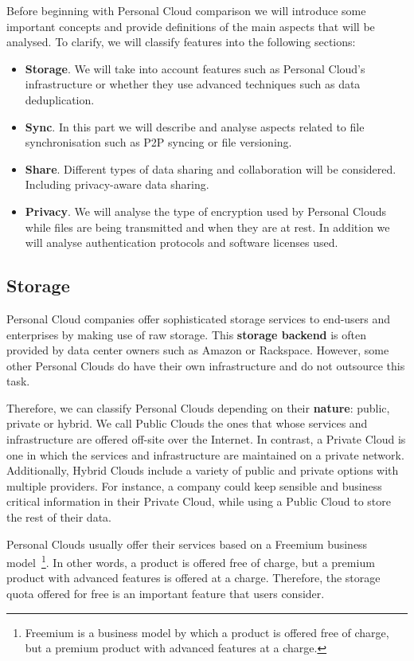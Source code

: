 Before beginning with Personal Cloud comparison we will introduce some important concepts
and provide definitions of the main aspects that will be analysed. To clarify, we will
classify features into the following sections:

\begin{itemize}
\item \textbf{Storage}. We will take into account features such as Personal Cloud's infrastructure or whether they use advanced techniques such as data deduplication.
\item \textbf{Sync}. In this part we will describe and analyse aspects related to file synchronisation such as P2P syncing or file versioning. 
\item \textbf{Share}. Different types of data sharing and collaboration will be considered. Including privacy-aware data sharing.
\item \textbf{Privacy}. We will analyse the type of encryption used by Personal Clouds while files are being transmitted and when they are at rest. In addition we will analyse authentication protocols and software licenses used.
\end{itemize}


\subsection{Storage}

Personal Cloud companies offer sophisticated storage services to end-users and enterprises by making use of raw storage. This \textbf{storage backend} is often provided by data center owners such as Amazon or Rackspace. However, some other Personal Clouds do have their own infrastructure and do not outsource this task.

Therefore, we can classify Personal Clouds depending on their \textbf{nature}: public, private or hybrid. We call Public Clouds the ones that whose services and infrastructure are offered off-site over the Internet. In contrast, a Private Cloud is one in which the services and infrastructure are maintained on a private network. Additionally, Hybrid Clouds include a variety of public and private options with multiple providers. For instance, a company could keep sensible and business critical information in their Private Cloud, while using a Public Cloud to store the rest of their data.

Personal Clouds usually offer their services based on a Freemium business model~\footnote{Freemium is a business model by which a product is offered free of charge, but a premium product with advanced features at a charge.}. In other words, a product is offered free of charge, but a premium product with advanced features is offered at a charge. Therefore, the storage quota offered for free is an important feature that users consider.

